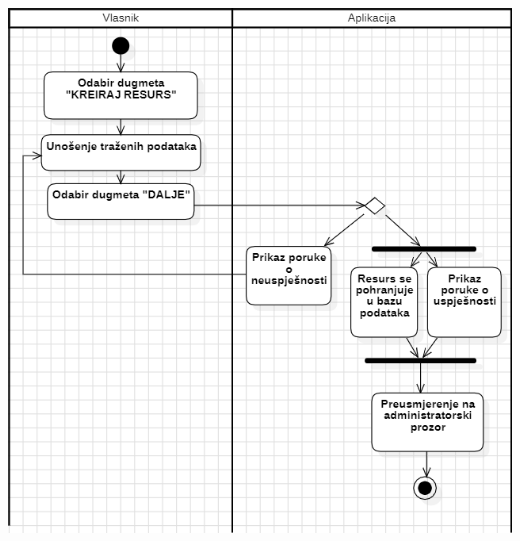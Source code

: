 \documentclass{scrreprt}
\begin{document}
\begin{center}
	\includegraphics[width=14cm]{./img/10.png}
\end{center}

\pagebreak
\end{document}
